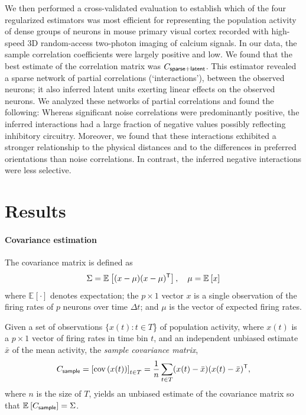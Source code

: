 \documentclass[10pt]{article}
\newcommand{\sq}[1]{\lq#1\rq}
\newcommand{\T}{{\sf T}}
\newcommand{\E}[2][]{\mathbb E_{#1}\left[ #2\right]}    %
\begin{document}
We then performed a cross-validated evaluation to establish which of the four regularized estimators was most efficient for representing the population activity of dense groups of neurons in mouse primary visual cortex recorded with high-speed 3D random-access two-photon imaging of calcium signals. In our data, the sample correlation coefficients were largely positive and low.  We found that the best estimate of the correlation matrix was $C_{\sf sparse+latent}$.  This estimator revealed a sparse network of partial correlations (\sq{interactions}), between the observed neurons; it also inferred latent units exerting linear effects on the observed neurons. We analyzed these networks of partial correlations and found the following: Whereas significant noise correlations were predominantly positive, the inferred interactions had a large fraction of negative values possibly reflecting inhibitory circuitry.  Moreover, we found that these interactions exhibited a stronger relationship to the physical distances and to the differences in preferred orientations than noise correlations. In contrast, the inferred negative interactions were less selective. 


\section*{Results}
\paragraph{Covariance estimation}
The covariance matrix is defined as
\begin{equation}\label{eq:true-covariance}
    \Sigma = \E{(x-\mu)(x-\mu)^\T},\quad \mu = \E{x}
\end{equation}
where $\E{\cdot}$ denotes expectation; the $p\times 1$ vector $x$ is a single observation of the firing rates of $p$ neurons over time $\Delta t$; and $\mu$ is the vector of expected firing rates. 

Given a set of observations $\{x(t): t\in T$\} of population activity, where $x(t)$ is a $p\times 1$ vector of firing rates in time bin $t$, and an independent unbiased estimate $\bar x$ of the mean activity, the \emph{sample covariance matrix},
\begin{equation}\label{eq:sample}
	C_{\sf sample} = \left[\mbox{cov}\left(x(t)\right)\right]_{t\in T} =\frac 1 n \sum\limits_{t\in T} (x(t)-\bar x)(x(t)-\bar x)^\T,
\end{equation}
where $n$ is the size of $T$, yields an unbiased estimate of the covariance matrix so that $\E{C_{\sf sample}}=\Sigma$.
\end{document}
